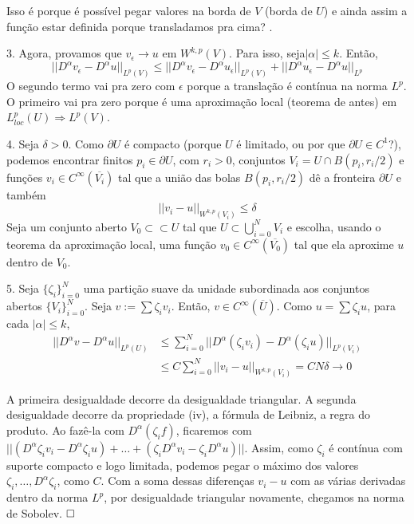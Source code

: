 \documentclass[11pt]{article}
\newcommand{\qed}{$\hfill\square$}
\newcommand{\pu}{\partial U}
\newcommand{\e}{\epsilon}
\begin{document}
 Isso é porque é possível pegar valores na borda de \( V \) (borda de \( U \)) e ainda assim a função estar definida porque transladamos pra cima? .

3. Agora, provamos que \( v_\e \rightarrow u \) em \( W^{k,p}(V) \). Para isso, seja\( |\alpha| \leq k \). Então, \[ ||D^\alpha v_\e - D^\alpha u||_{L^p(V)} \leq ||D^\alpha v_\e - D^\alpha u_\e||_{L^p(V)} + ||D^\alpha u_\e - D^\alpha u||_{L^p} \] O segundo termo vai pra zero com \( \e \) porque a translação é contínua na norma \( L^p \). O primeiro vai pra zero porque é uma aproximação local (teorema de antes) em \( L^p_{loc}(U) \Rightarrow L^p(V)  \).

4. Seja \( \delta >0 \). Como \( \pu \) é compacto (porque \( U \) é limitado, ou por que \( \pu \in C^1 \)?), podemos encontrar finitos \( p_i \in \pu \), com \( r_i>0 \), conjuntos \( V_i = U \cap B(p_i, r_i/2) \) e funções \( v_i \in C^\infty(\overline{V_i}) \) tal que a união das bolas \( B(p_i, r_i/2) \) dê a fronteira \( \pu \) e também \[ ||v_i - u||_{W^{k,p}(V_i)}\leq \delta \] Seja um conjunto aberto \( V_0 \subset\subset U \) tal que \( U \subset \bigcup_{i=0}^N V_i \) e escolha, usando o teorema da aproximação local, uma função \( v_0 \in C^\infty (\overline{V_0}) \) tal que ela aproxime \( u \) dentro de \( V_0 \).

5. Seja \( \{ \zeta_i \}_{i=0}^N \) uma partição suave da unidade subordinada aos conjuntos abertos \( \{V_i\}_{i=0}^N \). Seja \( v:= \sum \zeta_i v_i \). Então, \( v \in C^\infty (\overline{U}) \). Como \( u = \sum \zeta_i u \), para cada \( |\alpha|\leq k \), \begin{align*}
	||D^\alpha v - D^\alpha u||_{L^p(U)} &\leq \sum_{i=0}^{N} || D^\alpha (\zeta_i v_i) - D^\alpha (\zeta_i u)||_{L^p(V_i)}\\
	&\leq C \sum_{i=0}^N ||v_i - u||_{W^{k,p}(V_i)} = CN\delta \rightarrow 0
\end{align*}

A primeira desigualdade decorre da desigualdade triangular. A segunda desigualdade decorre da propriedade (iv), a fórmula de Leibniz, a regra do produto. Ao fazê-la com $D^\alpha(\zeta_i f)$, ficaremos com $||(D^\alpha\zeta_i v_i - D^\alpha\zeta_i u) + \ldots + (\zeta_i D^\alpha v_i - \zeta_i D^\alpha u) ||$. Assim, como $\zeta_i$ é contínua com suporte compacto e logo limitada, podemos pegar o máximo dos valores $\zeta_i, \ldots, D^\alpha\zeta_i$, como $C$. Com a soma dessas diferenças $v_i - u$ com as várias derivadas dentro da norma $L^p$, por desigualdade triangular novamente, chegamos na norma de Sobolev. \qed
\end{document}
